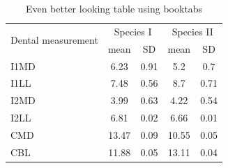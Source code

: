 \begin{table}
	\caption{Even better looking table using booktabs}
	\centering
	\label{table:good_table}
	\begin{tabular}{l c c c c}
		\toprule
		\multirow{2}{*}{Dental measurement} & \multicolumn{2}{c}{Species I} & \multicolumn{2}{c}{Species II} \\ 
		\cmidrule{2-5}
		& mean & SD  & mean & SD  \\ 
		\midrule
		I1MD & 6.23 & 0.91 & 5.2  & 0.7  \\
		
		I1LL & 7.48 & 0.56 & 8.7  & 0.71 \\
		
		I2MD & 3.99 & 0.63 & 4.22 & 0.54 \\
		
		I2LL & 6.81 & 0.02 & 6.66 & 0.01 \\
		
		CMD & 13.47 & 0.09 & 10.55 & 0.05 \\
		
		CBL & 11.88 & 0.05 & 13.11 & 0.04\\ 
		\bottomrule
	\end{tabular}
\end{table}
